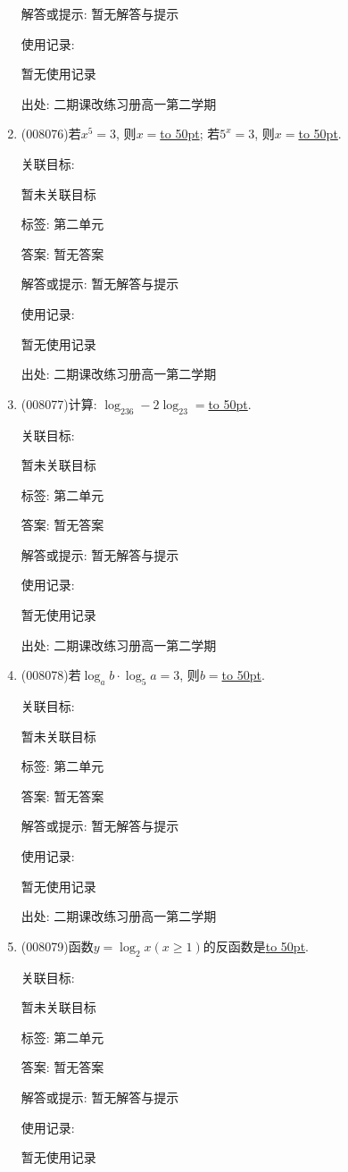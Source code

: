 \documentclass[10pt,a4paper]{article}
\newcommand{\blank}[1]{\underline{\hbox to #1pt{}}}
\begin{document}
\begin{enumerate}[1.]
解答或提示: 暂无解答与提示

使用记录:

暂无使用记录


出处: 二期课改练习册高一第二学期
\item { (008076)}若$x^5=3$, 则$x=$\blank{50}; 若$5^x=3$, 则$x=$\blank{50}.


关联目标:

暂未关联目标



标签: 第二单元

答案: 暂无答案

解答或提示: 暂无解答与提示

使用记录:

暂无使用记录


出处: 二期课改练习册高一第二学期
\item { (008077)}计算: $\log _236-2\log _23=$\blank{50}.


关联目标:

暂未关联目标



标签: 第二单元

答案: 暂无答案

解答或提示: 暂无解答与提示

使用记录:

暂无使用记录


出处: 二期课改练习册高一第二学期
\item { (008078)}若$\log _ab\cdot \log _5a=3$, 则$b=$\blank{50}.


关联目标:

暂未关联目标



标签: 第二单元

答案: 暂无答案

解答或提示: 暂无解答与提示

使用记录:

暂无使用记录


出处: 二期课改练习册高一第二学期
\item { (008079)}函数$y=\log _2x(x\ge 1)$的反函数是\blank{50}.


关联目标:

暂未关联目标



标签: 第二单元

答案: 暂无答案

解答或提示: 暂无解答与提示

使用记录:

暂无使用记录



\end{enumerate}
\end{document}
